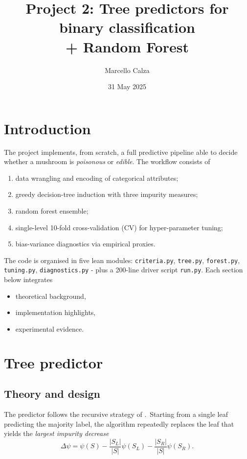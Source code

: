\documentclass[12pt]{report}
\title{\bfseries%
Project 2: Tree predictors for binary classification\\[4pt]
\large + Random Forest}
\author{Marcello Calza}
\date{31 May 2025}
\begin{document}
\maketitle
\tableofcontents
\clearpage

\section{Introduction}

The project implements, from scratch, a full predictive pipeline able to decide whether
a mushroom is \textit{poisonous} or \textit{edible}. The workflow consists of

\begin{enumerate}
  \item data wrangling and encoding of categorical attributes;
  \item greedy decision-tree induction with three impurity measures;
  \item random forest ensemble;
  \item single-level 10-fold cross-validation (CV) for hyper-parameter tuning;
  \item bias-variance diagnostics via empirical proxies.
\end{enumerate}

The code is organised in five lean modules: \texttt{criteria.py}, \texttt{tree.py},
\texttt{forest.py}, \texttt{tuning.py}, \texttt{diagnostics.py} - plus a 200-line driver
script \texttt{run.py}.  Each section below integrates

\begin{itemize}
  \item theoretical background,
  \item implementation highlights,
  \item experimental evidence.
\end{itemize}

\section{Tree predictor}

\subsection{Theory and design}
The predictor follows the recursive strategy of \citet[pp.\,253-254]{shalev}.\
Starting from a single leaf predicting the majority label, the algorithm repeatedly
replaces the leaf that yields the \emph{largest impurity decrease}
\[
  \Delta\psi
  =\psi(S)
  -\frac{|S_L|}{|S|}\psi(S_L)
  -\frac{|S_R|}{|S|}\psi(S_R).
\]
\end{document}
